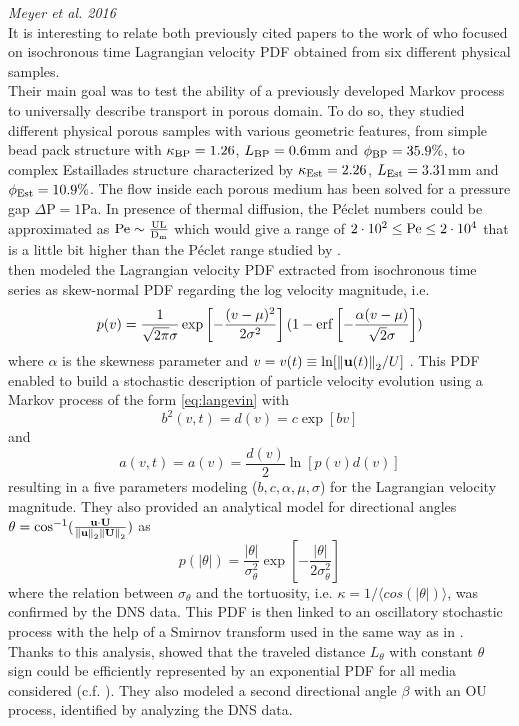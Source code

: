 \textit{Meyer et al. 2016}\\
It is interesting to relate both previously cited papers to the work of \citet{Meyer2016} who focused on isochronous time Lagrangian velocity PDF obtained from six different physical samples. \\
Their main goal was to test the ability of a previously developed Markov process to universally describe transport in porous domain.
To do so, they studied different physical porous samples with various geometric features, from simple bead pack structure with $\kappa_{\rm{BP}} = 1.26$, $L_{\rm{BP}}=0.6$mm and $\phi_{\rm{BP}}=35.9\%$, to complex Estaillades structure characterized by $\kappa_{\rm{Est}} = 2.26$, $L_{\rm{Est}}=3.31$mm and $\phi_{\rm{Est}}=10.9\%$.
The flow inside each porous medium has been solved for a pressure gap $\Delta\textrm{P}=1$Pa. 
In presence of thermal diffusion, the Péclet numbers could be approximated as $\rm{Pe}\sim\frac{UL}{D_m}$ which would give a range of $2\cdot10^2\leq\rm{Pe}\leq2\cdot10^4$ that is a little bit higher than the Péclet range studied by \citet{Dentz2017}.\\
\citeauthor{Meyer2016} then modeled the Lagrangian velocity PDF extracted from isochronous time series as skew-normal PDF regarding the log velocity magnitude, i.e.
\begin{equation}\label{eq:meyer_skew}
p(v)=\frac{1}{\sqrt{2\pi}\sigma}\exp\left[-\frac{(v-\mu)^2}{2\sigma^2}\right](1-\erf\left[-\frac{\alpha(v-\mu)}{\sqrt{2}\sigma}\right])
\end{equation}
where $\alpha$ is the skewness parameter and $v=v(t)\equiv\ln[\norm{\textbf{u}(t)}_2/U]$ . This PDF enabled to build a stochastic description of particle velocity evolution using a Markov process of the form \eqref{eq:langevin} with 
\[b^2(v,t)=d(v)=c\exp[bv]\]
and 
\[a(v,t)=a(v)=\frac{d(v)}{2}\ln[p(v)d(v)]\]
resulting in a five parameters modeling ($b,c,\alpha,\mu,\sigma$) for the Lagrangian velocity magnitude.
They also provided an analytical model for directional angles $\theta=\cos^{-1}(\frac{\textbf{u}\cdot\textbf{U}}{\norm{\textbf{u}}_2\norm{\textbf{U}}_2})$ as
\[p(|\theta|)=\frac{|\theta|}{\sigma_\theta^2}\exp\left[-\frac{|\theta|}{2\sigma_\theta^2}\right]\]
where the relation between $\sigma_\theta$ and the tortuosity, i.e. $\kappa=1/\langle cos(|\theta|)\rangle$, was confirmed by the DNS data. This PDF is then linked to an oscillatory stochastic process with the help of a Smirnov transform used in the same way as in \citet{Puyguiraud2019}. \\
Thanks to this analysis, \citeauthor{Meyer2016} showed that the traveled distance $L_\theta$ with constant $\theta$ sign could be efficiently represented by an exponential PDF for all media considered (c.f. \citet[Fig- 12]{Meyer2016}). They also modeled a second directional angle $\beta$ with an OU process, identified by analyzing the DNS data.\\
